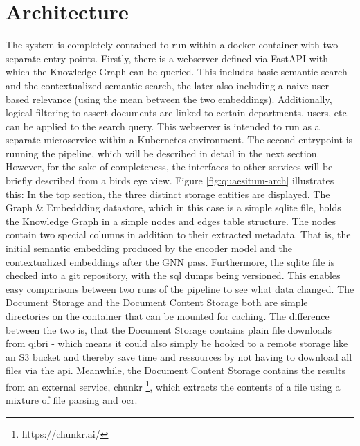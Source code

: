 \documentclass[draft,final]{vutinfth} %
\begin{document}
\section{Architecture}
The system is completely contained to run within a docker container with two separate entry points. Firstly, there is a webserver defined via FastAPI with which the Knowledge Graph can be queried. This includes basic semantic search and the contextualized semantic search, the later also including a naive user-based relevance (using the mean between the two embeddings). Additionally, logical filtering to assert documents are linked to certain departments, users, etc. can be applied to the search query. This webserver is intended to run as a separate microservice within a Kubernetes environment.
The second entrypoint is running the pipeline, which will be described in detail in the next section. However, for the sake of completeness, the interfaces to other services will be briefly described from a birds eye view. Figure \ref{fig:quaesitum-arch} illustrates this: In the top section, the three distinct storage entities are displayed. The Graph \& Embeddding datastore, which in this case is a simple sqlite file, holds the Knowledge Graph in a simple nodes and edges table structure. The nodes  contain two special columns in addition to their extracted metadata. That is, the initial semantic embedding produced by the encoder model and the contextualized embeddings after the GNN pass. Furthermore, the sqlite file is checked into a git repository, with the sql dumps being versioned. This enables easy comparisons between two runs of the pipeline to see what data changed. The Document Storage and the Document Content Storage both are simple directories on the container that can be mounted for caching. The difference between the two is, that the Document Storage contains plain file downloads from qibri - which means it could also simply be hooked to a remote storage like an S3 bucket and thereby save time and ressources by not having to download all files via the api. Meanwhile, the Document Content Storage contains the results from an external service, chunkr \footnote{https://chunkr.ai/}, which extracts the contents of a file using a mixture of file parsing and ocr.
\end{document}
